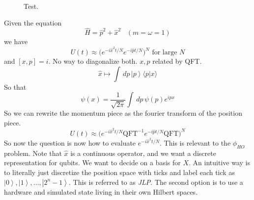 \documentclass{article}
\newcommand{\ket}[1]{\ensuremath{\left|#1\right\rangle}}
\newcommand{\braket}[2]{\langle #1 | #2 \rangle}
\begin{document}
\begin{example}[Exercise 2: I.D.4]
\begin{figure}[H]
      \caption{Test. } 
      \label{fig:two}
    \end{figure}
  \end{example}

  \begin{example}
    Given the equation 
    \begin{equation}
      \hat{H} = \hat{p}^2 + \hat{x}^2 \;\;\; (m = \omega = 1)
    \end{equation}
    we have 
    \begin{equation}
      U(t) \approx \bigg( e^{-i \hat{x}^2 t/N} e^{-i \hat{p} t/N} \bigg)^N \text{ for large } N
    \end{equation}
    and $[x, p] = i$. No way to diagonalize both. $x, p$ related by QFT. 
    \begin{equation}
      \hat{x} \mapsto \int \,dp \, \ket{p}\braket{p}{x}
    \end{equation}
    So that 
    \begin{equation}
      \psi (x) = \frac{1}{\sqrt{2\pi}} \int \,dp \, \psi(p) e^{i p x} 
    \end{equation}
    So we can rewrite the momentum piece as the fourier transform of the position piece. 
    \begin{equation}
      U(t) \approx \bigg( e^{-i \hat{x}^2 t/N} \mathrm{QFT}^{-1} e^{-i \hat{p} t/N} \mathrm{QFT} \bigg)^N 
    \end{equation}
  So now the question is now how to evaluate $e^{-i \hat{x}^2 t/N}$. This is relevant to the $\phi_{HO}$ problem. Note that $\hat{x}$ is a continuous operator, and we want a discrete representation for qubits. We want to decide on a basis for $X$. An intuitive way is to literally just discretize the position space with ticks and label each tick as $\ket{0}, \ket{1}, \ldots, \ket{2^n - 1}$. This is referred to as \textit{JLP}. The second option is to use a hardware and simulated state living in their own Hilbert spaces. 
  \end{example}
\end{document}
